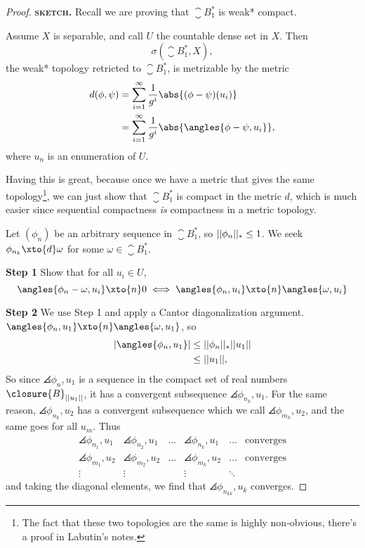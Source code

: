 \documentclass[a5paper]{article}
\theoremstyle{definition}%
\numberwithin{exercise}{section}
\theoremstyle{remark}%
\begin{document}
\begin{proof}
\textsc{\textbf{sketch.}} Recall we are proving that $\closure{B}^*_1$ is weak* compact. 

\noindent Assume $X$ is separable, and call $U$ the countable dense set in $X$. Then 
$$\sigma(\closure{B}^*_1,X),$$ 
the weak* topology retricted to $\closure{B}^*_1$, is metrizable by the metric
\begin{align*}
d(\phi,\psi)&=\sum_{i=1}^\infty \frac{1}{g^i}\abs{(\phi-\psi)(u_i)} \\
&=\sum_{i=1}^\infty \frac{1}{g^i}\abs{\angles{\phi-\psi,u_i}},
\end{align*}
where $u_n$ is an enumeration of $U$. 

\renewcommand{\B}{\closure{B}^*_1}
Having this is great, because once we have a metric that gives the same topology\footnote{The fact that these two topologies are the same is highly non-obvious, there's a proof in Labutin's notes.}, we can just show that $\closure{B}^*_1$ is compact in the metric $d$, which is much easier since sequential compactness \textit{is} compactness in a metric topology. 

Let $(\phi_n)$ be an arbitrary sequence in $\B$, so $\norm{\phi_n}_*\leq1$. We seek $\phi_{n_k}\xto{d} \omega$ for some $\omega\in \B$. 

\noindent \textbf{Step 1} Show that for all $u_i\in U$, 
$$\angles{\phi_n-\omega,u_i}\xto{n}0\iff\angles{\phi_n,u_i}\xto{n}\angles{\omega,u_i}$$

\noindent \textbf{Step 2} We use Step 1 and apply a Cantor diagonalization argument. $\angles{\phi_n,u_1}\xto{n}\angles{\omega,u_1}$, so 
\begin{align*}
|\angles{\phi_n,u_1}|&\leq \norm{\phi_n}_*\norm{u_1}\\
&\leq \norm{u_1},
\end{align*}
So since $\angles{\phi_n,u_1}$ is a sequence in the compact set of real numbers $\closure{B}_{\norm{u_1}}$, it has a convergent subsequence $\angles{\phi_{n_k},u_1}$. For the same reason, $\angles{\phi_{n_k},u_2}$ has a convergent subsequence which we call $\angles{\phi_{m_k},u_2}$, and the same goes for all $u_m$. Thus 
\[\begin{array}{cccccl}
\angles{\phi_{n_1},u_1} & \angles{\phi_{n_2},u_1} & \dots & \angles{\phi_{n_k},u_1} & \dots & \text{converges} \\
\angles{\phi_{m_1},u_2} & \angles{\phi_{m_2},u_2} & \dots & \angles{\phi_{m_k},u_2} & \dots & \text{converges} \\
\vdots & \vdots &&\vdots&\ddots
\end{array}\]
and taking the diagonal elements, we find that $\angles{\phi_{n_{kk}},u_k}$ converges.
\end{proof}
\end{document}

